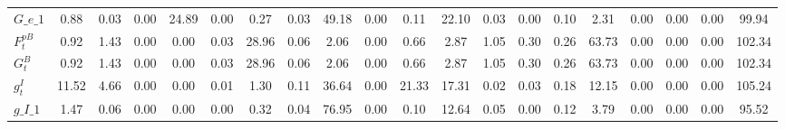\begin{center}
\begin{longtable}{lccccccccccccccccccc}
$G\_e\_1                    $	 & 	                0.88	 & 	                0.03	 & 	                0.00	 & 	               24.89	 & 	                0.00	 & 	                0.27	 & 	                0.03	 & 	               49.18	 & 	                0.00	 & 	                0.11	 & 	               22.10	 & 	                0.03	 & 	                0.00	 & 	                0.10	 & 	                2.31	 & 	                0.00	 & 	                0.00	 & 	                0.00	 & 	               99.94 \\ 
$ F^{pB}_t                  $	 & 	                0.92	 & 	                1.43	 & 	                0.00	 & 	                0.00	 & 	                0.03	 & 	               28.96	 & 	                0.06	 & 	                2.06	 & 	                0.00	 & 	                0.66	 & 	                2.87	 & 	                1.05	 & 	                0.30	 & 	                0.26	 & 	               63.73	 & 	                0.00	 & 	                0.00	 & 	                0.00	 & 	              102.34 \\ 
$ G^B_t                     $	 & 	                0.92	 & 	                1.43	 & 	                0.00	 & 	                0.00	 & 	                0.03	 & 	               28.96	 & 	                0.06	 & 	                2.06	 & 	                0.00	 & 	                0.66	 & 	                2.87	 & 	                1.05	 & 	                0.30	 & 	                0.26	 & 	               63.73	 & 	                0.00	 & 	                0.00	 & 	                0.00	 & 	              102.34 \\ 
$ g^I_t                     $	 & 	               11.52	 & 	                4.66	 & 	                0.00	 & 	                0.00	 & 	                0.01	 & 	                1.30	 & 	                0.11	 & 	               36.64	 & 	                0.00	 & 	               21.33	 & 	               17.31	 & 	                0.02	 & 	                0.03	 & 	                0.18	 & 	               12.15	 & 	                0.00	 & 	                0.00	 & 	                0.00	 & 	              105.24 \\ 
$g\_I\_1                    $	 & 	                1.47	 & 	                0.06	 & 	                0.00	 & 	                0.00	 & 	                0.00	 & 	                0.32	 & 	                0.04	 & 	               76.95	 & 	                0.00	 & 	                0.10	 & 	               12.64	 & 	                0.05	 & 	                0.00	 & 	                0.12	 & 	                3.79	 & 	                0.00	 & 	                0.00	 & 	                0.00	 & 	               95.52 \\ 

\end{longtable}
\end{center}

